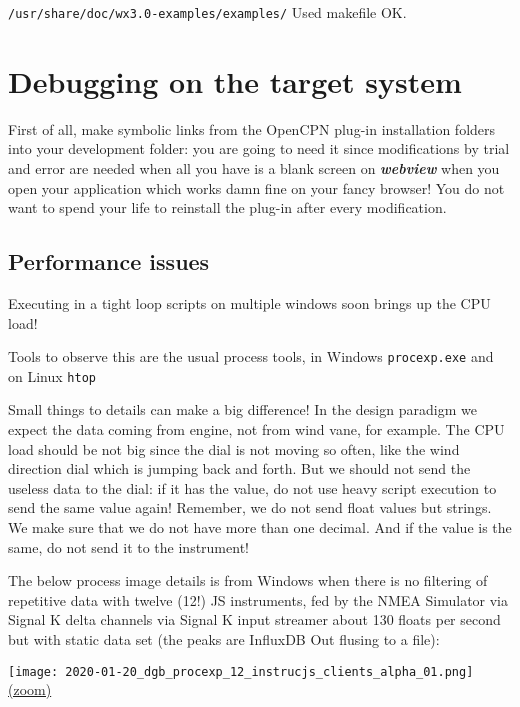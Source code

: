 \documentclass[11pt]{article}
\begin{document}
    \texttt{/usr/share/doc/wx3.0-examples/examples/} Used makefile OK.

    \hypertarget{debugging-on-the-target-system}{%
\section{Debugging on the target
system}\label{debugging-on-the-target-system}}

    First of all, make symbolic links from the OpenCPN plug-in installation
folders into your development folder: you are going to need it since
modifications by trial and error are needed when all you have is a blank
screen on \textbf{\emph{webview}} when you open your application which
works damn fine on your fancy browser! You do not want to spend your
life to reinstall the plug-in after every modification.

    \hypertarget{performance-issues}{%
\subsection{Performance issues}\label{performance-issues}}

    Executing in a tight loop scripts on multiple windows soon brings up the
CPU load!

    Tools to observe this are the usual process tools, in Windows
\texttt{procexp.exe} and on Linux \texttt{htop}

    Small things to details can make a big difference! In the design
paradigm we expect the data coming from engine, not from wind vane, for
example. The CPU load should be not big since the dial is not moving so
often, like the wind direction dial which is jumping back and forth. But
we should not send the useless data to the dial: if it has the value, do
not use heavy script execution to send the same value again! Remember,
we do not send float values but strings. We make sure that we do not
have more than one decimal. And if the value is the same, do not send it
to the instrument!

    The below process image details is from Windows when there is no
filtering of repetitive data with twelve (12!) JS instruments, fed by
the NMEA Simulator via Signal K delta channels via Signal K input
streamer about 130 floats per second but with static data set (the peaks
are InfluxDB Out flusing to a file):

    \texttt{[image: 2020-01-20\_dgb\_procexp\_12\_instrucjs\_clients\_alpha\_01.png]}
\href{img/2020-01-20_dgb_procexp_12_instrucjs_clients_alpha_01.png}{(zoom)}
\end{document}
